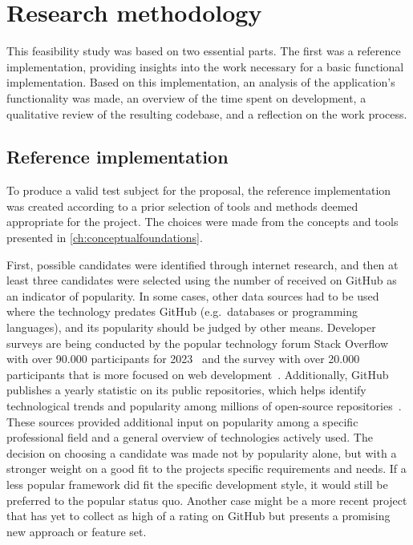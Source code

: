 \chapter{Research methodology}
\label{ch:methodology}

This feasibility study was based on two essential parts.
The first was a reference implementation, providing insights into the work necessary for a basic functional implementation.
Based on this implementation, an analysis of the application's functionality was made, an overview of the time spent on development, a qualitative review of the resulting codebase, and a reflection on the work process.

\section{Reference implementation}
\label{sec:reference-implementation}

To produce a valid test subject for the proposal, the reference implementation was created according to a prior selection of tools and methods deemed appropriate for the project.
The choices were made from the concepts and tools presented in \autoref{ch:conceptualfoundations}.

First, possible candidates were identified through internet research, and then at least three candidates were selected using the number of  received on GitHub as an indicator of popularity.
In some cases, other data sources had to be used where the technology predates GitHub (e.g.\ databases or programming languages), and its popularity should be judged by other means.
Developer surveys are being conducted by the popular technology forum Stack Overflow with over 90.000 participants for 2023~\parencite{stackOverflowPoll} and the  survey with over 20.000 participants that is more focused on web development~\parencite{stateOfJSSurvey}.
Additionally, GitHub publishes a yearly statistic on its public repositories, which helps identify technological trends and popularity among millions of open-source repositories~\parencite{stateOfTheOctoverse23}.
These sources provided additional input on popularity among a specific professional field and a general overview of technologies actively used.
The decision on choosing a candidate was made not by popularity alone, but with a stronger weight on a good fit to the project\textquotesingle s specific requirements and needs.
If a less popular framework did fit the specific development style, it would still be preferred to the popular status quo.
Another case might be a more recent project that has yet to collect as high of a rating on GitHub but presents a promising new approach or feature set.

